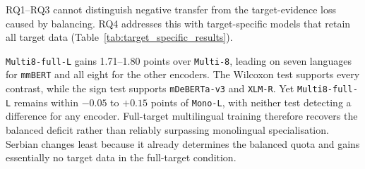 \documentclass{article}
\begin{document}
RQ1--RQ3 cannot distinguish negative transfer from the target-evidence loss caused by balancing.
RQ4 addresses this with target-specific models that retain all target data (Table~\ref{tab:target_specific_results}).
\begin{table}[!htbp]
\centering
\caption{RQ4 target-specific recovery. Panel (a) reports macro F1 and panel (b) paired contrasts. \texttt{Pretrain} abbreviates \texttt{Pretrain-Multi7-full-L}.}
\label{tab:target_specific_results}
\end{table}

\texttt{Multi8-full-L} gains 1.71--1.80 points over \texttt{Multi-8}, leading on seven languages for \texttt{mmBERT} and all eight for the other encoders.
The Wilcoxon test supports every contrast, while the sign test supports \texttt{mDeBERTa-v3} and \texttt{XLM-R}.
Yet \texttt{Multi8-full-L} remains within $-0.05$ to $+0.15$ points of \texttt{Mono-L}, with neither test detecting a difference for any encoder.
Full-target multilingual training therefore recovers the balanced deficit rather than reliably surpassing monolingual specialisation.
Serbian changes least because it already determines the balanced quota and gains essentially no target data in the full-target condition.
\end{document}
